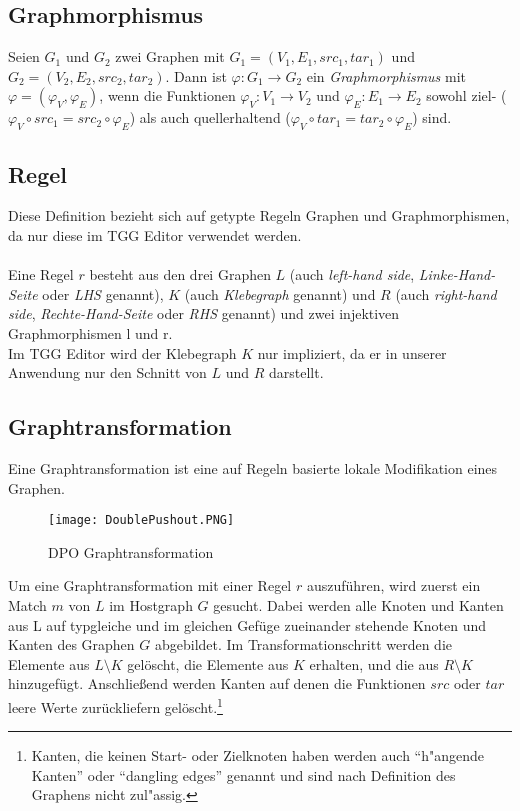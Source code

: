 \subsection{Graphmorphismus}
Seien $G_1$ und $G_2$ zwei Graphen mit $G_1 = (V_1,E_1,src_1,tar_1)$ und $G_2 = (V_2,E_2,src_2,tar_2)$. Dann ist $\varphi: G_1 \rightarrow G_2$ ein \emph{Graphmorphismus} mit  $\varphi = (\varphi_V,\varphi_E)$, wenn die Funktionen $\varphi_V: V_1 \rightarrow V_2$ und $\varphi_E: E_1 \rightarrow E_2$ sowohl ziel- ($\varphi_V \circ src_1 = src_2 \circ \varphi_E$) als auch quellerhaltend ($\varphi_V \circ tar_1 = tar_2 \circ \varphi_E$) sind.
\subsection{Regel}
Diese Definition bezieht sich auf getypte Regeln Graphen und Graphmorphismen, da nur diese im TGG Editor verwendet werden.\\
\\
Eine Regel $r$ besteht aus den drei Graphen $L$ (auch \emph{left-hand side}, \emph{Linke-Hand-Seite} oder \emph{LHS} genannt), $K$ (auch \emph{Klebegraph} genannt) und $R$ (auch \emph{right-hand side}, \emph{Rechte-Hand-Seite} oder \emph{RHS} genannt) und zwei injektiven Graphmorphismen l und r.\\
Im TGG Editor wird der Klebegraph $K$ nur impliziert, da er in unserer Anwendung nur den Schnitt von $L$ und $R$ darstellt.
\subsection{Graphtransformation}
Eine Graphtransformation ist eine auf Regeln basierte lokale Modifikation eines Graphen.
\begin{wrapfigure}{r}{5.5cm}
	\centering
	\texttt{[image: DoublePushout.PNG]}
	\caption{DPO Graph\-transformation}
	\label{fig:DoublePushout}
\end{wrapfigure}

Um eine Graphtransformation mit einer Regel $r$ auszuführen, wird zuerst ein Match $m$ von $L$ im Hostgraph $G$ gesucht. Dabei werden alle Knoten und Kanten aus L auf typgleiche und im gleichen Gefüge zueinander stehende Knoten und Kanten des Graphen $G$ abgebildet.
Im Transformationschritt werden die Elemente aus $L \setminus K$ gelöscht, die Elemente aus $K$ erhalten, und die aus $R \setminus K$  hinzugefügt. Anschließend werden Kanten auf denen die Funktionen $src$ oder $tar$ leere Werte zurückliefern gelöscht.\footnote{Kanten, die keinen Start- oder Zielknoten haben werden auch "`h"angende Kanten"' oder "`dangling edges"' genannt und sind nach Definition des Graphens nicht zul"assig.}

